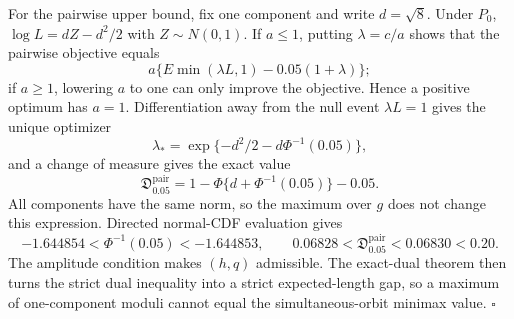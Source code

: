 For the pairwise upper bound, fix one component and write
\(d=\sqrt8\).  Under \(P_0\),
\(\log L=dZ-d^2/2\) with \(Z\sim N(0,1)\).  If \(a\leq1\), putting
\(\lambda=c/a\) shows that the pairwise objective equals
\[
a\{E\min(\lambda L,1)-0.05(1+\lambda)\};
\]
if \(a\geq1\), lowering \(a\) to one can only improve the objective.  Hence a
positive optimum has \(a=1\).  Differentiation away from the null event
\(\lambda L=1\) gives the unique optimizer
\[
\lambda_*=
\exp\{-d^2/2-d\Phi^{-1}(0.05)\},
\]
and a change of measure gives the exact value
\[
\mathfrak D_{0.05}^{\mathrm{pair}}
=1-\Phi\{d+\Phi^{-1}(0.05)\}-0.05.
\]
All components have the same norm, so the maximum over \(g\) does not change
this expression.  Directed normal-CDF evaluation gives
\[
-1.644854<\Phi^{-1}(0.05)<-1.644853,
\qquad
0.06828<\mathfrak D_{0.05}^{\mathrm{pair}}<0.06830<0.20.
\]
The amplitude condition makes \((h,q)\) admissible.  The exact-dual theorem
then turns the strict dual inequality into a strict expected-length gap, so a
maximum of one-component moduli cannot equal the simultaneous-orbit minimax
value. \(\square\)